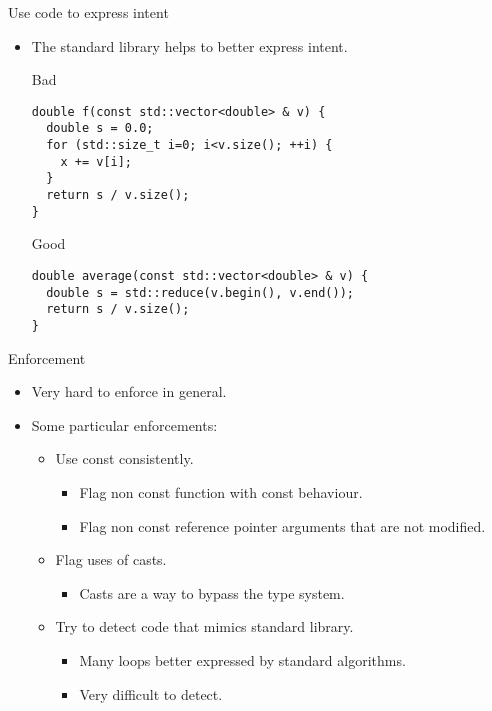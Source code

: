 \begin{frame}[t,fragile]{Use code to express intent}
\begin{itemize}
  \item The standard library helps to better express intent.

\pause
\begin{block}{Bad}
\begin{lstlisting}
double f(const std::vector<double> & v) {
  double s = 0.0;
  for (std::size_t i=0; i<v.size(); ++i) {
    x += v[i];
  }
  return s / v.size();
}
\end{lstlisting}
\end{block}

\pause
\begin{block}{Good}
\begin{lstlisting}
double average(const std::vector<double> & v) {
  double s = std::reduce(v.begin(), v.end());
  return s / v.size();
}
\end{lstlisting}
\end{block}

\end{itemize}
\end{frame}

\begin{frame}[t]{Enforcement}
\begin{itemize}
  \item Very hard to enforce in general.

  \item Some particular enforcements:
    \begin{itemize}
      \item Use const consistently.
        \begin{itemize}
          \item Flag non const function with const behaviour. 
          \item Flag non const reference pointer arguments that are not modified.
        \end{itemize}

      \pause
      \item Flag uses of casts.
        \begin{itemize}
          \item Casts are a way to bypass the type system.
        \end{itemize}
      \pause
      \item Try to detect code that mimics standard library.
        \begin{itemize}
          \item Many loops better expressed by standard algorithms.
          \item Very difficult to detect.
        \end{itemize}
    \end{itemize}
\end{itemize}
\end{frame}

